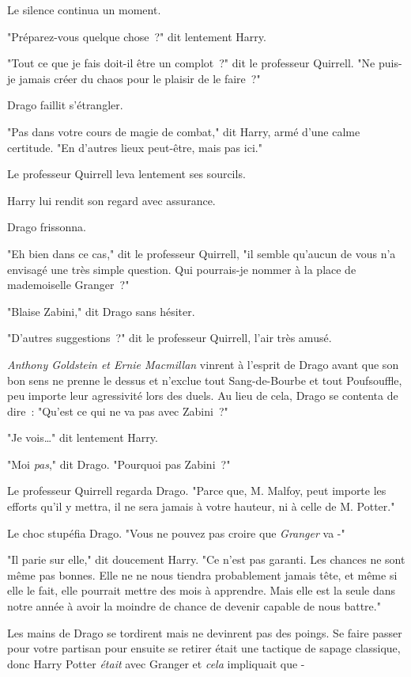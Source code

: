 Le silence continua un moment.

"Préparez-vous quelque chose~?" dit lentement Harry.

"Tout ce que je fais doit-il être un complot~?" dit le professeur Quirrell. "Ne puis-je jamais créer du chaos pour le plaisir de le faire~?"

Drago faillit s'étrangler.

"Pas dans votre cours de magie de combat," dit Harry, armé d'une calme certitude. "En d'autres lieux peut-être, mais pas ici."

Le professeur Quirrell leva lentement ses sourcils.

Harry lui rendit son regard avec assurance.

Drago frissonna.

"Eh bien dans ce cas," dit le professeur Quirrell, "il semble qu'aucun de vous n'a envisagé une très simple question. Qui pourrais-je nommer à la place de mademoiselle Granger~?"

"Blaise Zabini," dit Drago sans hésiter.

"D'autres suggestions~?" dit le professeur Quirrell, l'air très amusé.

\emph{Anthony Goldstein et Ernie Macmillan} vinrent à l'esprit de Drago avant que son bon sens ne prenne le dessus et n'exclue tout Sang-de-Bourbe et tout Poufsouffle, peu importe leur agressivité lors des duels. Au lieu de cela, Drago se contenta de dire~: "Qu'est ce qui ne va pas avec Zabini~?"

"Je vois…" dit lentement Harry.

"Moi \emph{pas}," dit Drago. "Pourquoi pas Zabini~?"

Le professeur Quirrell regarda Drago. "Parce que, M. Malfoy, peut importe les efforts qu'il y mettra, il ne sera jamais à votre hauteur, ni à celle de M. Potter."

Le choc stupéfia Drago. "Vous ne pouvez pas croire que \emph{Granger} va -"

"Il parie sur elle," dit doucement Harry. "Ce n'est pas garanti. Les chances ne sont même pas bonnes. Elle ne ne nous tiendra probablement jamais tête, et même si elle le fait, elle pourrait mettre des mois à apprendre. Mais elle est la seule dans notre année à avoir la moindre de chance de devenir capable de nous battre."

Les mains de Drago se tordirent mais ne devinrent pas des poings. Se faire passer pour votre partisan pour ensuite se retirer était une tactique de sapage classique, donc Harry Potter \emph{était} avec Granger et \emph{cela} impliquait que -


